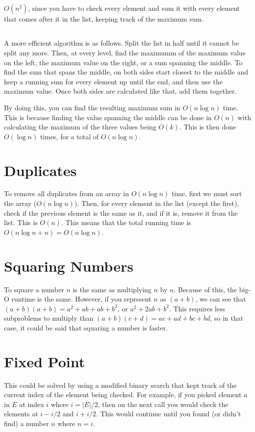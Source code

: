 \documentclass[14pt, letterpaper]{article}
\begin{document}
\subsection{}
$O(n^2)$, since you have to check every element and sum it with every element
that comes after it in the list, keeping track of the maximum sum.

\subsection{}
A more efficient algorithm is as follows. Split the list in half until it
cannot be split any more. Then, at every level, find the maximumm of the 
maximum value on the left, the maximum value on the right, or a sum spanning 
the middle. To find the sum that spans the middle, on both sides start closest 
to the middle and keep a running sum for every element up until the end, and 
then use the maximum value. Once both sides are calculated like that, add them 
together.

By doing this, you can find the resulting maximum sum in $O(n\log n)$ time.
This is because finding the value spanning the middle can be done in $O(n)$ 
with calculating the maximum of the three values being $O(k)$. This is then
done $O(\log n)$ times, for a total of $O(n\log n)$.

\section{Duplicates}
To remove all duplicates from an array in $O(n\log n)$ time, first we must sort
the array ($O(n\log n)$). Then, for every element in the list (except the 
first), check if the previous element is the same as it, and if it is, remove
it from the list. This is $O(n)$. This means that the total running time is 
$O(n\log n + n) = O(n\log n)$.

\section{Squaring Numbers}
To square a number $n$ is the same as multiplying $n$ by $n$. Because of this,
the big-O runtime is the same. However, if you represent $n$ as $(a + b)$,
we can see that $(a + b)(a + b) = a^2 + ab + ab + b^2$, or $a^2 + 2ab + b^2$.
This requires less subproblems to multiply than
$(a + b)(c + d) = ac + ad + bc + bd$, so in that case, it could be said that
squaring a number is faster.

\section{Fixed Point}
This could be solved by using a modified binary search that kept track of the
current index of the element being checked. For example, if you picked element
$a$ in $E$ at index $i$ where $i = |E|/2$, then on the next call you would 
check the elements at $i - i/2$ and $i + i/2$. This would continue until you
found (or didn't find) a number $n$ where $n = i$.
\end{document}
